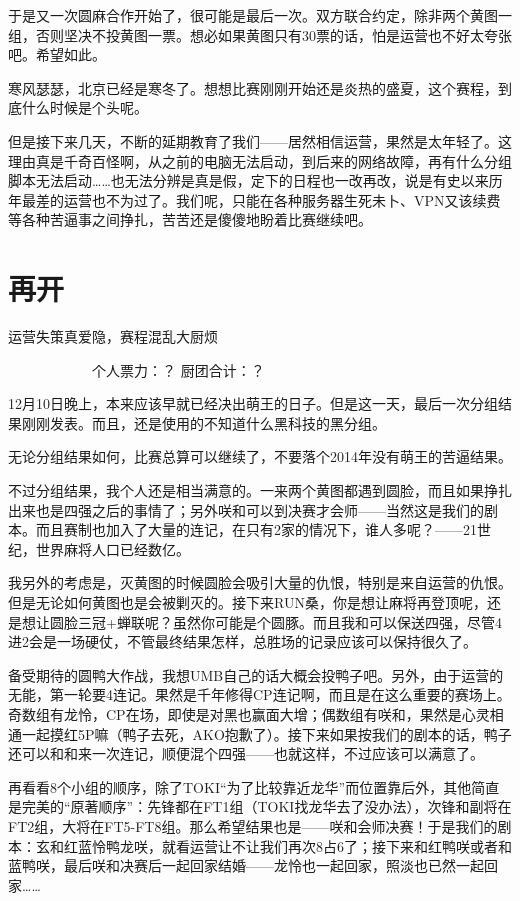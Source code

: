 于是又一次圆麻合作开始了，很可能是最后一次。双方联合约定，除非两个黄图一组，否则坚决不投黄图一票。想必如果黄图只有30票的话，怕是运营也不好太夸张吧。希望如此。

寒风瑟瑟，北京已经是寒冬了。想想比赛刚刚开始还是炎热的盛夏，这个赛程，到底什么时候是个头呢。

但是接下来几天，不断的延期教育了我们——居然相信运营，果然是太年轻了。这理由真是千奇百怪啊，从之前的电脑无法启动，到后来的网络故障，再有什么分组脚本无法启动……也无法分辨是真是假，定下的日程也一改再改，说是有史以来历年最差的运营也不为过了。我们呢，只能在各种服务器生死未卜、VPN又该续费等各种苦逼事之间挣扎，苦苦还是傻傻地盼着比赛继续吧。


\section{再开}
运营失策真爱隐，赛程混乱大厨烦

　　　　　　个人票力：？ 厨团合计：？

12月10日晚上，本来应该早就已经决出萌王的日子。但是这一天，最后一次分组结果刚刚发表。而且，还是使用的不知道什么黑科技的黑分组。

无论分组结果如何，比赛总算可以继续了，不要落个2014年没有萌王的苦逼结果。

不过分组结果，我个人还是相当满意的。一来两个黄图都遇到圆脸，而且如果挣扎出来也是四强之后的事情了；另外咲和可以到决赛才会师——当然这是我们的剧本。而且赛制也加入了大量的连记，在只有2家的情况下，谁人多呢？——21世纪，世界麻将人口已经数亿。

我另外的考虑是，灭黄图的时候圆脸会吸引大量的仇恨，特别是来自运营的仇恨。但是无论如何黄图也是会被剿灭的。接下来RUN桑，你是想让麻将再登顶呢，还是想让圆脸三冠+蝉联呢？虽然你可能是个圆豚。而且我和可以保送四强，尽管4进2会是一场硬仗，不管最终结果怎样，总胜场的记录应该可以保持很久了。

备受期待的圆鸭大作战，我想UMB自己的话大概会投鸭子吧。另外，由于运营的无能，第一轮要4连记。果然是千年修得CP连记啊，而且是在这么重要的赛场上。奇数组有龙怜，CP在场，即使是对黑也赢面大增；偶数组有咲和，果然是心灵相通一起摸红5P嘛（鸭子去死，AKO抱歉了）。接下来如果按我们的剧本的话，鸭子还可以和和来一次连记，顺便混个四强——也就这样，不过应该可以满意了。

再看看8个小组的顺序，除了TOKI“为了比较靠近龙华”而位置靠后外，其他简直是完美的“原著顺序”：先锋都在FT1组（TOKI找龙华去了没办法），次锋和副将在FT2组，大将在FT5-FT8组。那么希望结果也是——咲和会师决赛！于是我们的剧本：玄和红蓝怜鸭龙咲，就看运营让不让我们再次8占6了；接下来和红鸭咲或者和蓝鸭咲，最后咲和决赛后一起回家结婚——龙怜也一起回家，照淡也已然一起回家……


